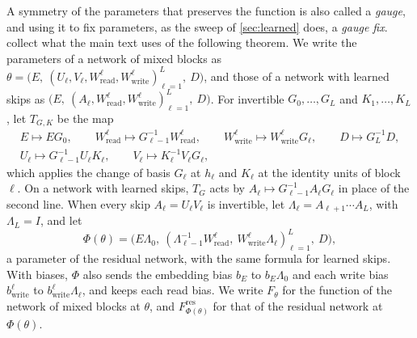 \documentclass[10pt]{article}
\theoremstyle{definition}
\theoremstyle{remark}
\newcommand{\Wread}{W_{\mathrm{read}}}
\newcommand{\Wwrite}{W_{\mathrm{write}}}
\begin{document}
A symmetry of the parameters that preserves the function is also called a \emph{gauge}, and using it to fix parameters, as the sweep of \cref{sec:learned} does, a \emph{gauge fix}.  collect what the main text uses of the following theorem. We write the parameters of a network of mixed blocks as $\theta = \big(E,\ (U_\ell, V_\ell, \Wread^{\ell}, \Wwrite^{\ell})_{\ell=1}^{L},\ D\big)$, and those of a network with learned skips as $\big(E,\ (A_\ell, \Wread^{\ell}, \Wwrite^{\ell})_{\ell=1}^{L},\ D\big)$. For invertible $G_0, \dots, G_L$ and $K_1, \dots, K_L$, let $T_{G,K}$ be the map
\begin{equation}\label{eq:gaugeact}
\begin{gathered}
E \mapsto EG_0, \qquad \Wread^{\ell} \mapsto G_{\ell-1}^{-1}\Wread^{\ell}, \qquad \Wwrite^{\ell} \mapsto \Wwrite^{\ell}G_\ell, \qquad D \mapsto G_L^{-1}D,\\
U_\ell \mapsto G_{\ell-1}^{-1}U_\ell K_\ell, \qquad V_\ell \mapsto K_\ell^{-1}V_\ell G_\ell,
\end{gathered}
\end{equation}
which applies the change of basis $G_\ell$ at $h_\ell$ and $K_\ell$ at the identity units of block $\ell$. On a network with learned skips, $T_G$ acts by $A_\ell \mapsto G_{\ell-1}^{-1}A_\ell G_\ell$ in place of the second line. When every skip $A_\ell = U_\ell V_\ell$ is invertible, let $\Lambda_\ell = A_{\ell+1}\cdots A_L$, with $\Lambda_L = I$, and let
\begin{equation}\label{eq:gaugemap}
\Phi(\theta) = \big(E\Lambda_0,\ (\Lambda_{\ell-1}^{-1}\Wread^{\ell},\ \Wwrite^{\ell}\Lambda_\ell)_{\ell=1}^{L},\ D\big),
\end{equation}
a parameter of the residual network, with the same formula for learned skips. With biases, $\Phi$ also sends the embedding bias $b_E$ to $b_E\Lambda_0$ and each write bias $b^{\ell}_{\mathrm{write}}$ to $b^{\ell}_{\mathrm{write}}\Lambda_\ell$, and keeps each read bias. We write $F_\theta$ for the function of the network of mixed blocks at $\theta$, and $F^{\mathrm{res}}_{\Phi(\theta)}$ for that of the residual network at $\Phi(\theta)$.
\end{document}
